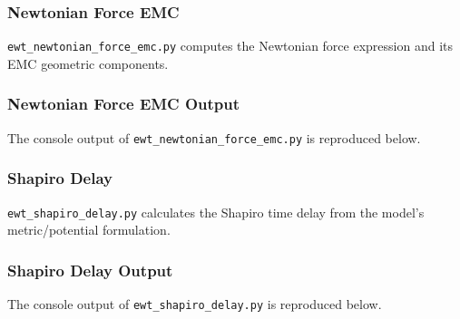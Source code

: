\documentclass[10pt,a4paper]{article}
\begin{document}


\subsubsection{Newtonian Force EMC}
\label{app:ewt_newtonian_force_emc}

\texttt{ewt\_newtonian\_force\_emc.py} computes the Newtonian force expression and its EMC geometric components.



\subsubsection{Newtonian Force EMC Output}
\label{app:ewt_newtonian_force_emc_output}

The console output of \texttt{ewt\_newtonian\_force\_emc.py} is reproduced below.



\subsubsection{Shapiro Delay}
\label{app:ewt_shapiro_delay}

\texttt{ewt\_shapiro\_delay.py} calculates the Shapiro time delay from the model's metric/potential formulation.



\subsubsection{Shapiro Delay Output}
\label{app:ewt_shapiro_delay_output}

The console output of \texttt{ewt\_shapiro\_delay.py} is reproduced below.
\end{document}
